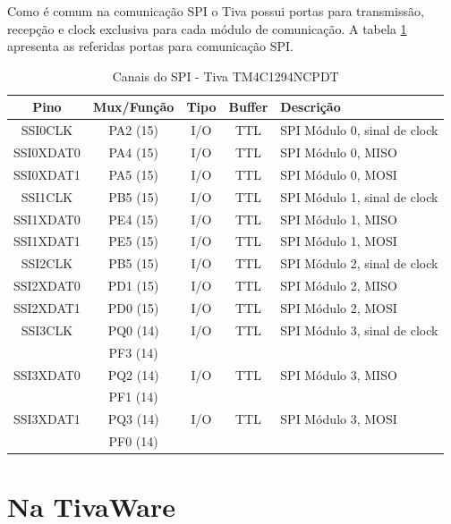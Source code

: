 Como é comum na comunicação SPI o Tiva possui portas para transmissão, recepção e clock exclusiva para cada  módulo de comunicação. A tabela \ref{tab:CanaisSPI} apresenta as referidas portas para comunicação SPI.

\begin{table}[H]
	\centering
	\caption{Canais do SPI - Tiva TM4C1294NCPDT \cite{DATASHEET_TIVA} }
	\label{tab:CanaisSPI}
	\begin{tabular}{|c|c|c|c|l|}
		\rowcolor[HTML]{000000} 
		{\color[HTML]{FFFFFF} Pino}  & {\color[HTML]{FFFFFF} Mux/Função} & {\color[HTML]{FFFFFF} Tipo} & {\color[HTML]{FFFFFF} Buffer} & {\color[HTML]{FFFFFF} Descrição}  \\
		\hline
		SSI0CLK   & PA2 (15) & I/O & TTL & SPI Módulo 0, sinal de clock   \\
		\hline
		SSI0XDAT0 & PA4 (15) & I/O & TTL & SPI Módulo 0, MISO \\
		\hline
		SSI0XDAT1 & PA5 (15) & I/O & TTL & SPI Módulo 0, MOSI \\
		\hline
		SSI1CLK   & PB5 (15) & I/O & TTL & SPI Módulo 1, sinal de clock   \\
		\hline
		SSI1XDAT0 & PE4 (15) & I/O & TTL & SPI Módulo 1, MISO  \\
		\hline
		SSI1XDAT1 & PE5 (15) & I/O & TTL & SPI Módulo 1, MOSI  \\
		\hline
		SSI2CLK   & PB5 (15) & I/O & TTL & SPI Módulo 2, sinal de clock   \\
		\hline
		SSI2XDAT0 & PD1 (15) & I/O & TTL & SPI Módulo 2, MISO  \\
		\hline
		SSI2XDAT1 & PD0 (15) & I/O & TTL & SPI Módulo 2, MOSI  \\
		\hline
		SSI3CLK   & PQ0 (14) & I/O & TTL & SPI Módulo 3, sinal de clock   \\
		          & PF3 (14) &     &     &                                \\
		\hline
		SSI3XDAT0 & PQ2 (14) & I/O & TTL & SPI Módulo 3, MISO  \\
		          & PF1 (14) &     &     &                     \\
		\hline
		SSI3XDAT1 & PQ3 (14) & I/O & TTL & SPI Módulo 3, MOSI  \\
		          & PF0 (14) &     &     &                     \\
		\hline
	\end{tabular}
\end{table}


\section{Na TivaWare}

